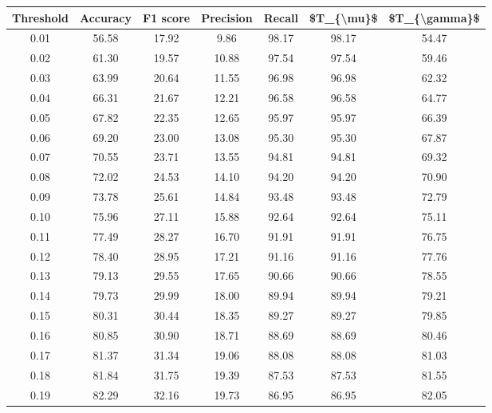 \begin{tabular}{|c|c|c|c|c|c|c|}
\hline
 Threshold &  Accuracy &  F1 score &  Precision &  Recall &  \$T\_\{\textbackslash mu\}\$ &  \$T\_\{\textbackslash gamma\}\$ \\
\hline
      0.01 &     56.58 &     17.92 &       9.86 &   98.17 &      98.17 &         54.47 \\
      0.02 &     61.30 &     19.57 &      10.88 &   97.54 &      97.54 &         59.46 \\
      0.03 &     63.99 &     20.64 &      11.55 &   96.98 &      96.98 &         62.32 \\
      0.04 &     66.31 &     21.67 &      12.21 &   96.58 &      96.58 &         64.77 \\
      0.05 &     67.82 &     22.35 &      12.65 &   95.97 &      95.97 &         66.39 \\
      0.06 &     69.20 &     23.00 &      13.08 &   95.30 &      95.30 &         67.87 \\
      0.07 &     70.55 &     23.71 &      13.55 &   94.81 &      94.81 &         69.32 \\
      0.08 &     72.02 &     24.53 &      14.10 &   94.20 &      94.20 &         70.90 \\
      0.09 &     73.78 &     25.61 &      14.84 &   93.48 &      93.48 &         72.79 \\
      0.10 &     75.96 &     27.11 &      15.88 &   92.64 &      92.64 &         75.11 \\
      0.11 &     77.49 &     28.27 &      16.70 &   91.91 &      91.91 &         76.75 \\
      0.12 &     78.40 &     28.95 &      17.21 &   91.16 &      91.16 &         77.76 \\
      0.13 &     79.13 &     29.55 &      17.65 &   90.66 &      90.66 &         78.55 \\
      0.14 &     79.73 &     29.99 &      18.00 &   89.94 &      89.94 &         79.21 \\
      0.15 &     80.31 &     30.44 &      18.35 &   89.27 &      89.27 &         79.85 \\
      0.16 &     80.85 &     30.90 &      18.71 &   88.69 &      88.69 &         80.46 \\
      0.17 &     81.37 &     31.34 &      19.06 &   88.08 &      88.08 &         81.03 \\
      0.18 &     81.84 &     31.75 &      19.39 &   87.53 &      87.53 &         81.55 \\
      0.19 &     82.29 &     32.16 &      19.73 &   86.95 &      86.95 &         82.05 \\

\end{tabular}
